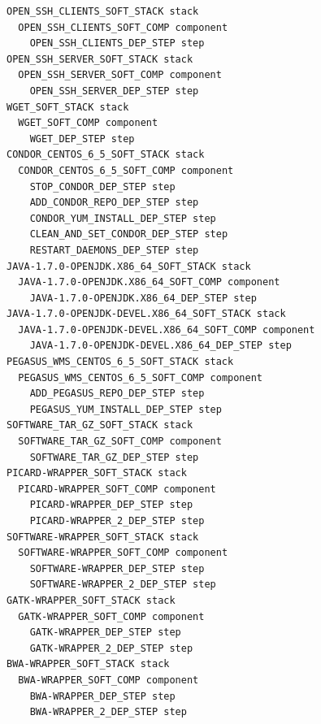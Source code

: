 \begin{lstlisting}[caption={Abstract deployment plan of the SoyKB WF.}, label={lst:plan-soykb}]
OPEN_SSH_CLIENTS_SOFT_STACK stack
  OPEN_SSH_CLIENTS_SOFT_COMP component
    OPEN_SSH_CLIENTS_DEP_STEP step
OPEN_SSH_SERVER_SOFT_STACK stack
  OPEN_SSH_SERVER_SOFT_COMP component
    OPEN_SSH_SERVER_DEP_STEP step
WGET_SOFT_STACK stack
  WGET_SOFT_COMP component
    WGET_DEP_STEP step
CONDOR_CENTOS_6_5_SOFT_STACK stack
  CONDOR_CENTOS_6_5_SOFT_COMP component
    STOP_CONDOR_DEP_STEP step
    ADD_CONDOR_REPO_DEP_STEP step
    CONDOR_YUM_INSTALL_DEP_STEP step
    CLEAN_AND_SET_CONDOR_DEP_STEP step
    RESTART_DAEMONS_DEP_STEP step
JAVA-1.7.0-OPENJDK.X86_64_SOFT_STACK stack
  JAVA-1.7.0-OPENJDK.X86_64_SOFT_COMP component
    JAVA-1.7.0-OPENJDK.X86_64_DEP_STEP step
JAVA-1.7.0-OPENJDK-DEVEL.X86_64_SOFT_STACK stack
  JAVA-1.7.0-OPENJDK-DEVEL.X86_64_SOFT_COMP component
    JAVA-1.7.0-OPENJDK-DEVEL.X86_64_DEP_STEP step
PEGASUS_WMS_CENTOS_6_5_SOFT_STACK stack
  PEGASUS_WMS_CENTOS_6_5_SOFT_COMP component
    ADD_PEGASUS_REPO_DEP_STEP step
    PEGASUS_YUM_INSTALL_DEP_STEP step
SOFTWARE_TAR_GZ_SOFT_STACK stack
  SOFTWARE_TAR_GZ_SOFT_COMP component
    SOFTWARE_TAR_GZ_DEP_STEP step
PICARD-WRAPPER_SOFT_STACK stack
  PICARD-WRAPPER_SOFT_COMP component
    PICARD-WRAPPER_DEP_STEP step
    PICARD-WRAPPER_2_DEP_STEP step
SOFTWARE-WRAPPER_SOFT_STACK stack
  SOFTWARE-WRAPPER_SOFT_COMP component
    SOFTWARE-WRAPPER_DEP_STEP step
    SOFTWARE-WRAPPER_2_DEP_STEP step
GATK-WRAPPER_SOFT_STACK stack
  GATK-WRAPPER_SOFT_COMP component
    GATK-WRAPPER_DEP_STEP step
    GATK-WRAPPER_2_DEP_STEP step
BWA-WRAPPER_SOFT_STACK stack
  BWA-WRAPPER_SOFT_COMP component
    BWA-WRAPPER_DEP_STEP step
    BWA-WRAPPER_2_DEP_STEP step
\end{lstlisting}



